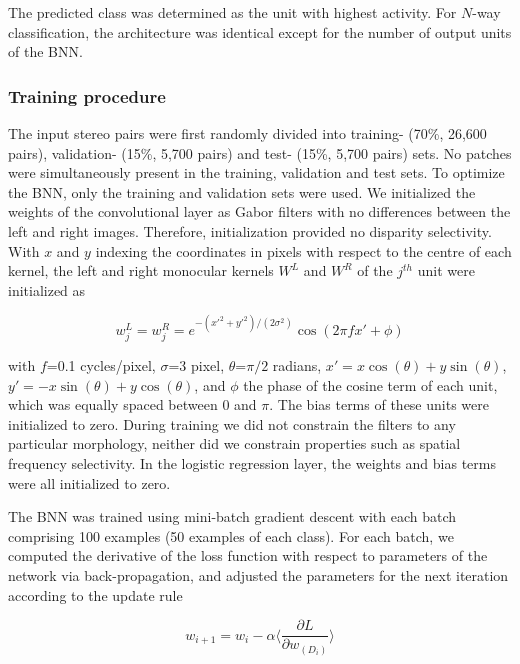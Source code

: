 The predicted class was determined as the unit with highest activity. For $N$-way classification, the architecture was identical except for the number of output units of the BNN.

\subsubsection*{Training procedure}

The input stereo pairs were first randomly divided into training- (70\%, 26,600 pairs), validation- (15\%, 5,700 pairs) and test- (15\%, 5,700 pairs) sets. No patches were simultaneously present in the training, validation and test sets. To optimize the BNN, only the training and validation sets were used. We initialized the weights of the convolutional layer as Gabor filters with no differences between the left and right images. Therefore, initialization provided no disparity selectivity. With $x$ and $y$ indexing the coordinates in pixels with respect to the centre of each kernel, the left and right monocular kernels $W^L$ and $W^R$ of the $j^{th}$ unit were initialized as

\begin{equation} 
w_j^L = w_j^R = e^{-(x'^2+y'^2)/(2\sigma^2)} \cos⁡(2\pi f x' + \phi)
\end{equation}

with $f$=0.1 cycles/pixel, $\sigma$=3 pixel, $\theta$=$\pi/2$ radians, $x'=x \cos (\theta)+y \sin (\theta)$, $y'=-x \sin (\theta) + y \cos (\theta)$, and $\phi$  the phase of the cosine term of each unit, which was equally spaced between $0$ and $\pi$. The bias terms of these units were initialized to zero. During training we did not constrain the filters to any particular morphology, neither did we constrain properties such as spatial frequency selectivity. In the logistic regression layer, the weights and bias terms were all initialized to zero. 

The BNN was trained using mini-batch gradient descent with each batch comprising 100 examples (50 examples of each class). For each batch, we computed the derivative of the loss function with respect to parameters of the network via back-propagation, and adjusted the parameters for the next iteration according to the update rule

\begin{equation}
  w_{i+1}=w_i - \alpha \Bigg \langle \frac{\partial L}{\partial w_{(D_i)}} \Bigg \rangle
\end{equation}

